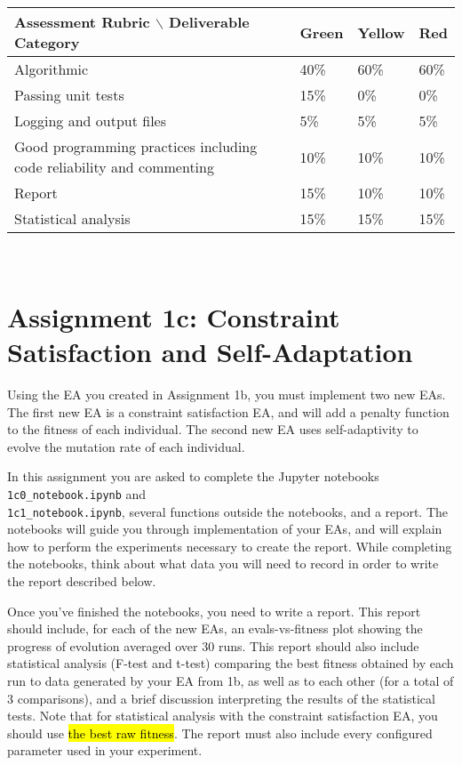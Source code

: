 \documentclass{article}
\begin{document}
\begin{tabular}{l|l|l|l|}
  Assessment Rubric $\backslash$ Deliverable Category & Green       & Yellow        & Red\\ \hline \hline  
  Algorithmic                                                              & 40\% & 60\% & 60\%\\
  \hline Passing unit tests                       & 15\%  & 0\%   & 0\%\\
  \hline Logging and output files                      & 5\%  & 5\%   & 5\%\\
  \hline Good programming practices including code reliability and commenting      & 10\%  & 10\% & 10\%\\
  \hline Report    & 15\%  & 10\% & 10\% \\
  \hline Statistical analysis                                          &  15\%   & 15\% &15\%\\
\end{tabular}\\

\newpage

\section*{Assignment 1c: Constraint Satisfaction and Self-Adaptation}
Using the EA you created in Assignment 1b, you must implement two new EAs. The first new EA is a constraint satisfaction EA, and will add a penalty function to the fitness of each individual. The second new EA uses self-adaptivity to evolve the mutation rate of each individual.

In this assignment you are asked to complete the Jupyter notebooks \texttt{1c0\_notebook.ipynb} and\\ \texttt{1c1\_notebook.ipynb}, several functions outside the notebooks, and a report. The notebooks will guide you through implementation of your EAs, and will explain how to perform the experiments necessary to create the report. While completing the notebooks, think about what data you will need to record in order to write the report described below.

Once you've finished the notebooks, you need to write a report. This report should include, for each of the new EAs, an evals-vs-fitness plot showing the progress of evolution averaged over 30 runs. This report should also include statistical analysis (F-test and t-test) comparing the best fitness obtained by each run to data generated by your EA from 1b, as well as to each other (for a total of 3 comparisons), and a brief discussion interpreting the results of the statistical tests. Note that for statistical analysis with the constraint satisfaction EA, you should use \hl{the best raw fitness}. The report must also include every configured parameter used in your experiment.
\end{document}
